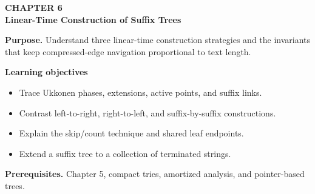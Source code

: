 \documentclass[11pt]{article}
\begin{document}
\begin{tcolorbox}[
  enhanced,breakable,colback=Primary!4,colframe=Primary,boxrule=0.9pt,
  arc=2mm,left=3mm,right=3mm,top=2.5mm,bottom=2.5mm]
{\sffamily\color{Accent}\bfseries CHAPTER 6}\\[-1pt]
{\sffamily\LARGE\bfseries\color{Primary} Linear-Time Construction of Suffix Trees}

\vspace{2pt}
\textbf{Purpose.} Understand three linear-time construction strategies and the invariants that keep compressed-edge navigation proportional to text length.

\textbf{Learning objectives}
\begin{itemize}
  \item Trace Ukkonen phases, extensions, active points, and suffix links.
  \item Contrast left-to-right, right-to-left, and suffix-by-suffix constructions.
  \item Explain the skip/count technique and shared leaf endpoints.
  \item Extend a suffix tree to a collection of terminated strings.
\end{itemize}

\textbf{Prerequisites.} Chapter 5, compact tries, amortized analysis, and pointer-based trees.
\end{tcolorbox}
\end{document}
